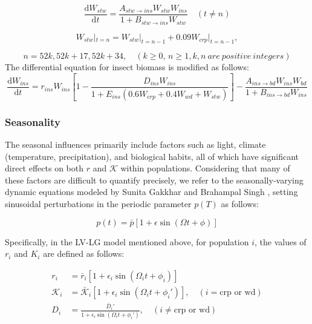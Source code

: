 \documentclass{HZNUMCM}
\begin{document}
        \begin{equation}
          \frac{\mathrm{d}W_{stw}}{\mathrm{d}t} = \frac{A_{stw\rightarrow ins} W_{stw} W_{ins}}{1 + B_{stw\rightarrow ins} W_{stw}} \quad (t \neq n)
        \end{equation}

        \begin{equation}
          W_{stw}|_{t=n} = W_{stw}|_{t=n-1} + 0.09 W_{crp}|_{t=n-1},
        \end{equation}
        
        \begin{equation}
          n = 52k, 52k+17, 52k+34, \quad (k \geqslant 0, \, n \geqslant 1, k,n\ are\ positive\ integers)
        \end{equation}
        The differential equation for insect biomass is modified as follows:
        \begin{equation}
          \frac{\mathrm{d}W_{ins}}{\mathrm{d}t} = r_{ins} W_{ins} \left[ 1 - \frac{D_{ins} W_{ins}}{1 + E_{ins} \left( 0.6 W_{crp} + 0.4 W_{wd} + W_{stw} \right)} \right] - \frac{A_{ins\rightarrow bd} W_{ins} W_{bd}}{1 + B_{ins\rightarrow bd} W_{ins}}
        \end{equation}

      \subsubsection{Seasonality}
        The seasonal influences primarily include factors such as light, 
        climate (temperature, precipitation), and biological habits, 
        all of which have significant direct effects on both $r$ and $\mathscr{K}$ within populations. 
        Considering that many of these factors are difficult to quantify precisely, 
        we refer to the seasonally-varying dynamic equations modeled by Sunita Gakkhar and Brahampal Singh \cite{GAKKHAR20061239}, 
        setting sinusoidal perturbations in the periodic parameter $p(T)$ as follows:

        \begin{equation}
          p(t) = \bar{p} \left[ 1 + \epsilon \sin (\Omega t + \phi) \right]
        \end{equation}

        Specifically, in the LV-LG model mentioned above, 
        for population $i$, the values of $r_i$ and $K_i$ are defined as follows:

        \begin{align}
          r_i &= \bar{r}_i \left[ 1 + \epsilon_i \sin \left( \Omega_i t + \phi_i \right) \right] \\
          \mathscr{K}_i &= \bar{\mathscr{K}}_i \left[ 1 + \epsilon_i \sin \left( \Omega_i t + \phi_i' \right) \right], \quad \left( i = \text{crp or wd} \right) \\
          D_i &= \frac{\bar{D}_i'}{1 + \epsilon_i \sin \left( \Omega_i t + \phi_i' \right)}, \quad \left( i \neq \text{crp or wd} \right)
        \end{align}
\end{document}
